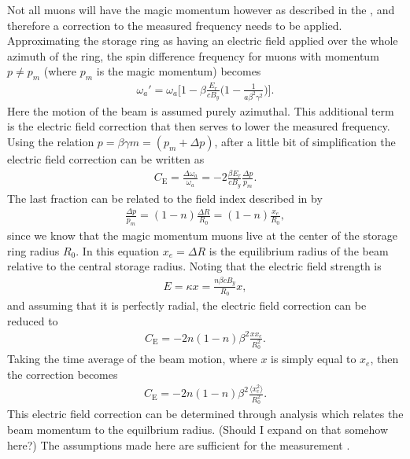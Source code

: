 Not all muons will have the magic momentum however as described in the , and therefore a correction to the measured \wa frequency needs to be applied. Approximating the storage ring as having an electric field applied over the whole azimuth of the ring, the spin difference frequency for muons with momentum $p \neq p_{m}$ (where $p_{m}$ is the magic momentum) becomes  
        \begin{align} \label{eq:wafinal}
            \omega_{a}' = \omega_{a} \Big[ 1 - \beta \frac{E_{r}}{c B_{y}} \Big( 1 - \frac{1}{a \beta^{2} \gamma^{2}} \Big) \Big].
        \end{align}
Here the motion of the beam is assumed purely azimuthal. This additional term is the electric field correction that then serves to lower the measured \wa frequency. Using the relation $p = \beta \gamma m = (p_{m} + \Delta p)$, after a little bit of simplification the electric field correction can be written as
        \begin{align}
            C_{\text{E}} = \frac{\Delta\omega_{a}}{\omega_{a}} = -2 \frac{\beta E_{r}}{c B_{y}} \frac{\Delta p}{p_{m}}.
        \end{align}
The last fraction can be related to the field index described in  by
        \begin{align}
            \frac{\Delta p}{p_{m}} = (1-n) \frac{\Delta R}{R_{0}} = (1-n) \frac{x_{e}}{R_{0}}, 
        \end{align}
since we know that the magic momentum muons live at the center of the storage ring radius $R_{0}$. In this equation $x_{e} = \Delta R$ is the equilibrium radius of the beam relative to the central storage radius. Noting that the electric field strength is 
        \begin{align}
            E = \kappa x = \frac{n \beta c B_{y}}{R_{0}} x,
        \end{align}
and assuming that it is perfectly radial, the electric field correction can be reduced to 
        \begin{align}
            C_{\text{E}} = -2n (1-n) \beta^{2} \frac{x x_{e}}{R_{0}^{2}}.
        \end{align}
Taking the time average of the beam motion, where $x$ is simply equal to $x_{e}$, then the correction becomes
        \begin{align}
            C_{\text{E}} = -2n (1-n) \beta^{2} \frac{\langle x_{e}^{2} \rangle}{R_{0}^{2}}.
        \end{align}
This electric field correction can be determined through analysis which relates the beam momentum to the equilbrium radius. (Should I expand on that somehow here?) The assumptions made here are sufficient for the \gmtwo measurement \cite{something}.


